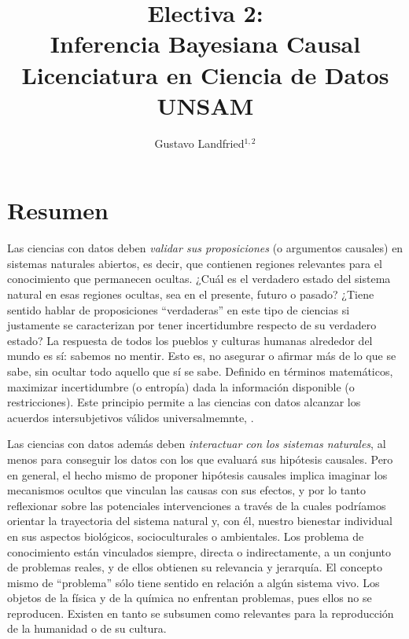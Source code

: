 \documentclass[11pt]{article}
\title{\huge Electiva 2: \\ Inferencia Bayesiana Causal \\[0.4cm]  \LARGE Licenciatura en Ciencia de Datos UNSAM}
\author{Gustavo Landfried$^{1,2}$}
\affil{\footnotesize 1. Departamento de Computación. Facultad de Ciencias Exactas y Naturales. Universidad de Buenos Aires.}
\affil{\vspace{-0.2cm}\footnotesize 2. Bayes Plurinacional}
\affil[]{Correspondencia: \texttt{glandfried@dc.uba.ar}}
\begin{document}
\maketitle

\section{Resumen}

Las ciencias con datos deben \emph{validar sus proposiciones} (o argumentos causales) en sistemas naturales abiertos, es decir, que contienen regiones relevantes para el conocimiento que permanecen ocultas.
¿Cuál es el verdadero estado del sistema natural en esas regiones ocultas, sea en el presente, futuro o pasado?
¿Tiene sentido hablar de proposiciones ``verdaderas'' en este tipo de ciencias si justamente se caracterizan por tener incertidumbre respecto de su verdadero estado?
La respuesta de todos los pueblos y culturas humanas alrededor del mundo es sí: sabemos no mentir.
Esto es, no asegurar o afirmar más de lo que se sabe, sin ocultar todo aquello que sí se sabe.
Definido en términos matemáticos, maximizar incertidumbre (o entropía) dada la información disponible (o restricciones).
Este principio permite a las ciencias con datos alcanzar los acuerdos intersubjetivos válidos universalmemnte, .


Las ciencias con datos además deben \emph{interactuar con los sistemas naturales}, al menos para conseguir los datos con los que evaluará sus hipótesis causales.
Pero en general, el hecho mismo de proponer hipótesis causales implica imaginar los mecanismos ocultos que vinculan las causas con sus efectos, y por lo tanto reflexionar sobre las potenciales intervenciones a través de la cuales podríamos orientar la trayectoria del sistema natural y, con él, nuestro bienestar individual en sus aspectos biológicos, socioculturales o ambientales.
Los problema de conocimiento están vinculados siempre, directa o indirectamente, a un conjunto de problemas reales, y de ellos obtienen su relevancia y jerarquía.
El concepto mismo de ``problema'' sólo tiene sentido en relación a algún sistema vivo.
Los objetos de la física y de la química no enfrentan problemas, pues ellos no se reproducen.
Existen en tanto se subsumen como relevantes para la reproducción de la humanidad o de su cultura.

\end{document}
